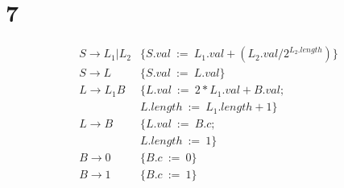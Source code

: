 \documentclass{article}
\begin{document}
\section*{7}
\noindent

\begin{align*}
S\rightarrow L_1|L_2&\{S.val\ :=\ L_1.val+(L_2.val/2^{L_2.length})\}\\
S\rightarrow L\ \ \ \ \ \ &\{S.val\ :=\ L.val\}\\
L\rightarrow L_1B\ \ &\{L.val\ :=\ 2*L_1.val+B.val;\\
&L.length\ :=\ L_1.length+1\}\\
L\rightarrow B\ \ \ \ \ \ &\{L.val\ :=\ B.c;\\
&L.length\ :=\ 1\}\\
B\rightarrow 0\ \ \ \ \ \ \ &\{B.c\ :=\ 0\}\\
B\rightarrow 1\ \ \ \ \ \ \ &\{B.c\ :=\ 1\}
\end{align*}
\end{document}
